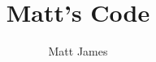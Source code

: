\documentclass[a4paper,10pt]{book}
\begin{document}
\author{Matt James}
\title{Matt's Code}
\date{}

\frontmatter
\maketitle
\tableofcontents


\mainmatter









\backmatter
\end{document}
